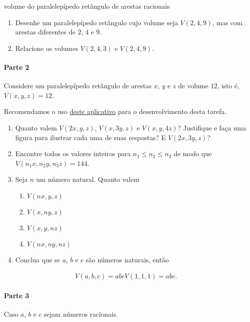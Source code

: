 \begin{task}{volume do paralelepípedo retângulo de arestas racionais}
\begin{enumerate}
\item {} 
Desenhe um paralelepípedo retângulo cujo volume seja \(V(2, 4, 9)\), mas com arestas diferentes de $2$, $4$ e $9$.

\item {} 
Relacione os volumes \(V(2, 4, 3)\) e \(V(2, 4, 9)\).

\end{enumerate}

\paragraph{Parte 2} Considere um paralelepípedo retângulo de arestas \(x\), \(y\) e \(z\) de volume $12$, isto é, \(V(x, y, z) = 12\).

Recomendamos o uso \href{https://ggbm.at/uq2gd3ub}{deste aplicativo}  para o desenvolvimento desta tarefa.
\begin{enumerate}
\item {} 
Quanto valem \(V(2x, y, z)\), \(V(x, 3y, z)\) e \(V(x, y, 4z)\)? Justifique e faça uma figura para ilustrar cada uma de suas respostas? E  \(V(2x, 3y, z)\)?

\item {} 
Encontre todos os valores inteiros para \(n_1\leq n_2 \leq n_3\) de modo que \(V(n_1 x, n_2 y, n_3 z) = 144\).

\item {} 
Seja \(n\) um número natural. Quanto valem 

\begin{enumerate}
\item\(V(nx, y, z)\)
\item\(V(x, ny, z)\)
\item\(V(x, y, nz)\)
\item\(V(n x, n y, n z)\)
\end{enumerate}

\item {} 
Conclua que se \(a\), \(b\) e \(c\) são números naturais, então

\end{enumerate}
\begin{equation*}
\begin{split}V(a, b, c) = abc V(1,1,1) = abc.\end{split}
\end{equation*}
\paragraph{Parte 3} Caso \(a\), \(b\) e \(c\) sejam números racionais.


\end{task}
